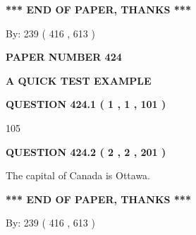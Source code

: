 \documentclass[12pt]{article}
\begin{document}
\vspace{1.0in} 
{\textbf{\large{ *** END OF PAPER, THANKS *** }}} 
   
   
\hspace{1.0in} By: 
 239 ( 416 ,  613 )
   
   
   
   
\newpage 
\setcounter{page}{ 
   424001 } 
   
   
   
   
 {\textbf{ \Large{ PAPER NUMBER  424  }}}
   
   
\vspace{0.2in}
   
   
   
   
   
   
 \vspace{0.2in}
{\LARGE {\textbf{ A QUICK TEST EXAMPLE}}}
   
   
  
\vspace{0.2in}
  
{\textbf{\Large{QUESTION
424.1 
 ( 1 , 1 , 101 )
}}}
  
  
 
 
\noindent{}

105
 
 
  
\vspace{0.2in}
  
{\textbf{\Large{QUESTION
424.2 
 ( 2 , 2 , 201 )
}}}
  
  
 
 
\noindent{}
 
 
The capital of Canada is Ottawa.
 
 
 
 
   
   
 \vspace{0.2in}
 
   
   
   
   
\vspace{1.0in} 
{\textbf{\large{ *** END OF PAPER, THANKS *** }}} 
   
   
\hspace{1.0in} By: 
 239 ( 416 ,  613 )
   
\end{document}
